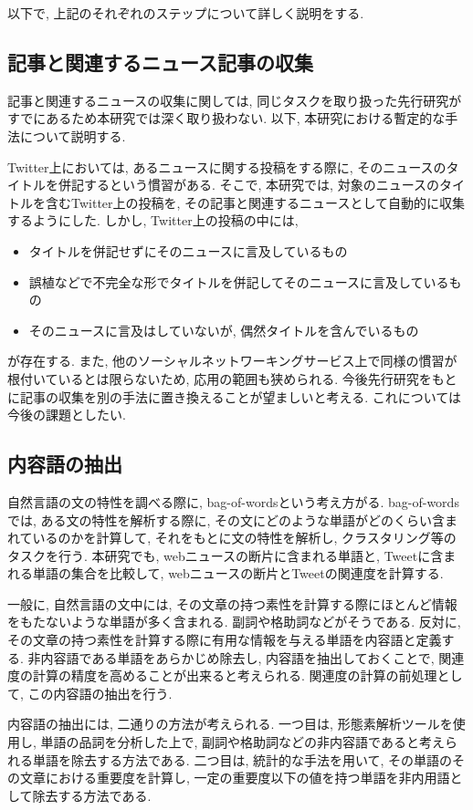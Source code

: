 \documentclass[12pt]{jarticle}
\begin{document}
以下で, 上記のそれぞれのステップについて詳しく説明をする.

\subsection{記事と関連するニュース記事の収集}
記事と関連するニュースの収集に関しては, 同じタスクを取り扱った先行研究がすでにあるため本研究では深く取り扱わない. 以下, 本研究における暫定的な手法について説明する.

Twitter上においては, あるニュースに関する投稿をする際に, そのニュースのタイトルを併記するという慣習がある. そこで, 本研究では, 対象のニュースのタイトルを含むTwitter上の投稿を, その記事と関連するニュースとして自動的に収集するようにした. しかし, Twitter上の投稿の中には,

\begin{itemize}
  \item タイトルを併記せずにそのニュースに言及しているもの
  \item 誤植などで不完全な形でタイトルを併記してそのニュースに言及しているもの
  \item そのニュースに言及はしていないが, 偶然タイトルを含んでいるもの
\end{itemize}
が存在する. また, 他のソーシャルネットワーキングサービス上で同様の慣習が根付いているとは限らないため, 応用の範囲も狭められる. 今後先行研究をもとに記事の収集を別の手法に置き換えることが望ましいと考える. これについては今後の課題としたい.

\subsection{内容語の抽出}
自然言語の文の特性を調べる際に, bag-of-words\cite{nlpml}という考え方がる. bag-of-wordsでは, ある文の特性を解析する際に, その文にどのような単語がどのくらい含まれているのかを計算して, それをもとに文の特性を解析し, クラスタリング等のタスクを行う. 本研究でも, webニュースの断片に含まれる単語と, Tweetに含まれる単語の集合を比較して, webニュースの断片とTweetの関連度を計算する.

一般に, 自然言語の文中には, その文章の持つ素性を計算する際にほとんど情報をもたないような単語が多く含まれる. 副詞や格助詞などがそうである. 反対に, その文章の持つ素性を計算する際に有用な情報を与える単語を内容語と定義する. 非内容語である単語をあらかじめ除去し, 内容語を抽出しておくことで, 関連度の計算の精度を高めることが出来ると考えられる. 関連度の計算の前処理として, この内容語の抽出を行う.

内容語の抽出には, 二通りの方法が考えられる. 一つ目は, 形態素解析ツールを使用し, 単語の品詞を分析した上で, 副詞や格助詞などの非内容語であると考えられる単語を除去する方法である. 二つ目は, 統計的な手法を用いて, その単語のその文章における重要度を計算し, 一定の重要度以下の値を持つ単語を非内用語として除去する方法である.
\end{document}
